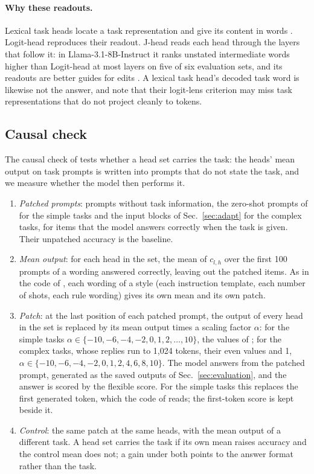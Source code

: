 \documentclass[11pt,a4paper]{article}
\begin{document}
\paragraph{Why these readouts.} Lexical task heads locate a task representation and give its content in words \citep{yang2026shared}. Logit-head reproduces their readout. J-head reads each head through the layers that follow it: in Llama-3.1-8B-Instruct it ranks unstated intermediate words higher than Logit-head at most layers on five of six evaluation sets, and its readouts are better guides for edits \citep[Secs.~3--4]{merlo2026headjlens}. A lexical task head's decoded task word is likewise not the answer, and \citet[Sec.~4]{yang2026shared} note that their logit-lens criterion may miss task representations that do not project cleanly to tokens.

\subsection{Causal check}\label{sec:causal}
The causal check of \citet[Sec.~2.3.2, App.~G]{yang2026shared} tests whether a head set carries the task: the heads' mean output on task prompts is written into prompts that do not state the task, and we measure whether the model then performs it.
\begin{enumerate}
\item \emph{Patched prompts}: prompts without task information, the zero-shot prompts of \citet{yang2026shared} for the simple tasks and the input blocks of Sec.~\ref{sec:adapt} for the complex tasks, for items that the model answers correctly when the task is given. Their unpatched accuracy is the baseline.
\item \emph{Mean output}: for each head in the set, the mean of $c_{l,h}$ over the first 100 prompts of a wording answered correctly, leaving out the patched items. As in the code of \citet{yang2026shared}, each wording of a style (each instruction template, each number of shots, each rule wording) gives its own mean and its own patch.
\item \emph{Patch}: at the last position of each patched prompt, the output of every head in the set is replaced by its mean output times a scaling factor $\alpha$: for the simple tasks $\alpha\in\{-10,-6,-4,-2,0,1,2,\dots,10\}$, the values of \citet{yang2026shared}; for the complex tasks, whose replies run to 1,024 tokens, their even values and 1, $\alpha\in\{-10,-6,-4,-2,0,1,2,4,6,8,10\}$. The model answers from the patched prompt, generated as the saved outputs of Sec.~\ref{sec:evaluation}, and the answer is scored by the flexible score. For the simple tasks this replaces the first generated token, which the code of \citet{yang2026shared} reads; the first-token score is kept beside it.
\item \emph{Control}: the same patch at the same heads, with the mean output of a different task. A head set carries the task if its own mean raises accuracy and the control mean does not; a gain under both points to the answer format rather than the task.
\end{enumerate}
\end{document}
